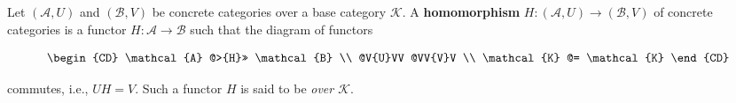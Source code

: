 Let $(\mathcal{A}, U)$ and $(\mathcal{B}, V)$ be concrete categories over a base category $\mathcal{K}$. A \textbf{homomorphism} $H: (\mathcal{A}, U) \to (\mathcal{B}, V)$ of concrete categories is a functor $H: \mathcal{A} \to \mathcal{B}$ such that the diagram of functors

\[
\begin{CD}
\mathcal{A} @>{H}>> \mathcal{B} \\
@V{U}VV @VV{V}V \\
\mathcal{K} @= \mathcal{K}
\end{CD}
\]

commutes, i.e., $UH = V$. Such a functor $H$ is said to be \emph{over $\mathcal{K}$}.

